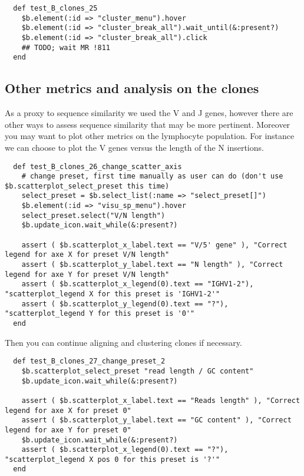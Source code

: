 \begin{verbatim}
  def test_B_clones_25
    $b.element(:id => "cluster_menu").hover
    $b.element(:id => "cluster_break_all").wait_until(&:present?)
    $b.element(:id => "cluster_break_all").click
    ## TODO; wait MR !811
  end
\end{verbatim}

\subsection{Other metrics and analysis on the clones}

As a proxy to sequence similarity we used the V and J genes, however there are
other ways to assess sequence similarity that may be more pertinent.
Moreover you may want to plot other metrics on the lymphocyte population.
%
For instance we can choose to plot the V genes versus the length of the N
insertions.
\begin{verbatim}
  def test_B_clones_26_change_scatter_axis
    # change preset, first time manually as user can do (don't use $b.scatterplot_select_preset this time) 
    select_preset = $b.select_list(:name => "select_preset[]")
    $b.element(:id => "visu_sp_menu").hover
    select_preset.select("V/N length")
    $b.update_icon.wait_while(&:present?)

    assert ( $b.scatterplot_x_label.text == "V/5' gene" ), "Correct legend for axe X for preset V/N length"
    assert ( $b.scatterplot_y_label.text == "N length" ), "Correct legend for axe Y for preset V/N length"
    assert ( $b.scatterplot_x_legend(0).text == "IGHV1-2"), "scatterplot_legend X for this preset is 'IGHV1-2'"
    assert ( $b.scatterplot_y_legend(0).text == "?"), "scatterplot_legend Y for this preset is '0'"
  end
\end{verbatim}

Then you can continue aligning and clustering clones if necessary.

\begin{verbatim}
  def test_B_clones_27_change_preset_2
    $b.scatterplot_select_preset "read length / GC content"
    $b.update_icon.wait_while(&:present?)

    assert ( $b.scatterplot_x_label.text == "Reads length" ), "Correct legend for axe X for preset 0"
    assert ( $b.scatterplot_y_label.text == "GC content" ), "Correct legend for axe Y for preset 0"
    $b.update_icon.wait_while(&:present?)
    assert ( $b.scatterplot_x_legend(0).text == "?"), "scatterplot_legend X pos 0 for this preset is '?'"
  end
\end{verbatim}

